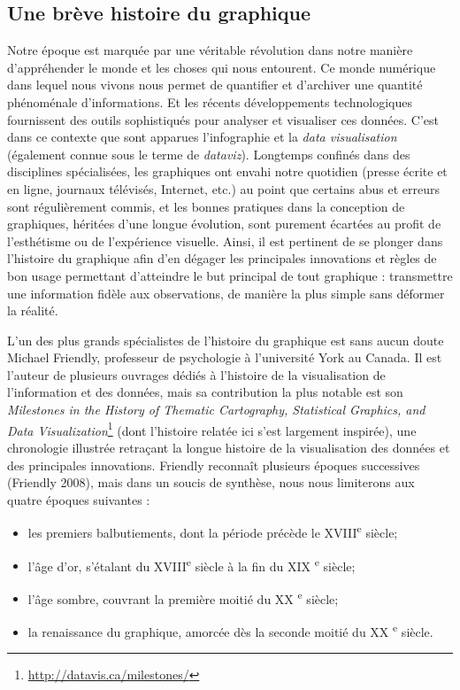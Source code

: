 \documentclass[]{article}
\providecommand{\tightlist}{%
  \setlength{\itemsep}{0pt}\setlength{\parskip}{0pt}}
\begin{document}
\hypertarget{une-breve-histoire-du-graphique}{%
\subsection{Une brève histoire du graphique}\label{une-breve-histoire-du-graphique}}

Notre époque est marquée par une véritable révolution dans notre manière d'appréhender le monde et les choses qui nous entourent. Ce monde numérique dans lequel nous vivons nous permet de quantifier et d'archiver une quantité phénoménale d'informations. Et les récents développements technologiques fournissent des outils sophistiqués pour analyser et visualiser ces données. C'est dans ce contexte que sont apparues l'infographie et la \emph{data visualisation} (également connue sous le terme de \emph{dataviz}). Longtemps confinés dans des disciplines spécialisées, les graphiques ont envahi notre quotidien (presse écrite et en ligne, journaux télévisés, Internet, etc.) au point que certains abus et erreurs sont régulièrement commis, et les bonnes pratiques dans la conception de graphiques, héritées d'une longue évolution, sont purement écartées au profit de l'esthétisme ou de l'expérience visuelle. Ainsi, il est pertinent de se plonger dans l'histoire du graphique afin d'en dégager les principales innovations et règles de bon usage permettant d'atteindre le but principal de tout graphique : transmettre une information fidèle aux observations, de manière la plus simple sans déformer la réalité.

L'un des plus grands spécialistes de l'histoire du graphique est sans aucun doute Michael Friendly, professeur de psychologie à l'université York au Canada. Il est l'auteur de plusieurs ouvrages dédiés à l'histoire de la visualisation de l'information et des données, mais sa contribution la plus notable est son \emph{Milestones in the History of Thematic Cartography, Statistical Graphics, and Data Visualization}\footnote{\url{http://datavis.ca/milestones/}} (dont l'histoire relatée ici s'est largement inspirée), une chronologie illustrée retraçant la longue histoire de la visualisation des données et des principales innovations. Friendly reconnaît plusieurs époques successives (Friendly 2008), mais dans un soucis de synthèse, nous nous limiterons aux quatre époques suivantes :

\begin{itemize}
\tightlist
\item
  les premiers balbutiements, dont la période précède le XVIII\textsuperscript{e} siècle;
\item
  l'âge d'or, s'étalant du XVIII\textsuperscript{e} siècle à la fin du XIX \textsuperscript{e} siècle;
\item
  l'âge sombre, couvrant la première moitié du XX \textsuperscript{e} siècle;
\item
  la renaissance du graphique, amorcée dès la seconde moitié du XX \textsuperscript{e} siècle.
\end{itemize}
\end{document}
